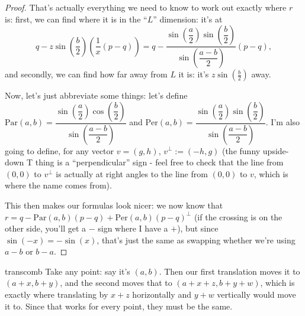 \begin{proof}
That's actually everything we need to know to work out exactly where $r$ is: first, we can find where it is in the ``$L$'' dimension: it's at $$q - z\sin\left(\frac{b}{2}\right)\left(\dfrac{1}{x}(p - q)\right) = q - \dfrac{\sin\left(\dfrac{a}{2}\right)\sin\left(\dfrac{b}{2}\right)}{\sin\left(\dfrac{a-b}{2}\right)}(p-q),$$ and secondly, we can find how far away from $L$ it is: it's $z\sin\left(\frac{b}{2}\right)$ away. 

Now, let's just abbreviate some things: let's define $\mathrm{Par}(a,b) = \dfrac{\sin\left(\dfrac{a}{2}\right)\cos\left(\dfrac{b}{2}\right)}{\sin\left(\dfrac{a-b}{2}\right)}$ and $\mathrm{Per}(a,b) = \dfrac{\sin\left(\dfrac{a}{2}\right)\sin\left(\dfrac{b}{2}\right)}{\sin\left(\dfrac{a-b}{2}\right)}$. I'm also going to define, for any vector $v = (g,h)$, $v^\perp := (-h,g)$ (the funny upside-down T thing is a ``perpendicular'' sign - feel free to check that the line from $(0,0)$ to $v^\perp$ is actually at right angles to the line from $(0,0)$ to $v$, which is where the name comes from). 

This then makes our formulas look nicer: we now know that $r = q - \mathrm{Par}(a,b)(p - q) + \mathrm{Per}(a,b)(p - q)^\perp$ (if the crossing is on the other side, you'll get a $-$ sign where I have a $+$), but since $\sin(-x) = -\sin(x)$, that's just the same as swapping whether we're using $a - b$ or $b - a$.  
\end{proof}


\begin{thmpf}{transcomb}
    Take any point: say it's $(a,b)$. Then our first translation moves it to $(a+x,b+y)$, and the second moves that to $(a+x+z,b+y+w)$, which is exactly where translating by $x+z$ horizontally and $y+w$ vertically would move it to. Since that works for every point, they must be the same. 
\end{thmpf}

